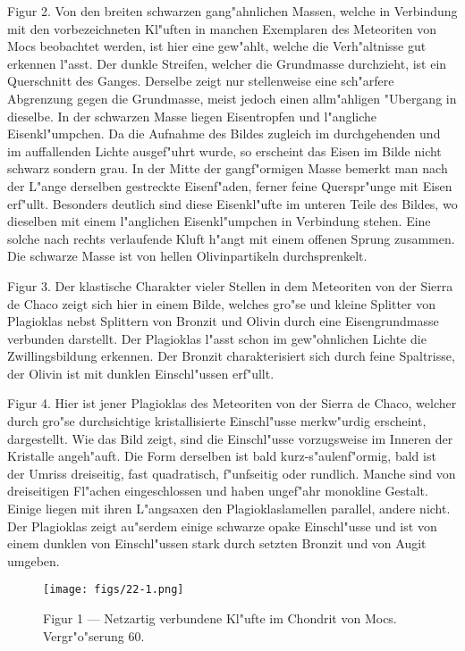 \documentclass[a4paper, 11pt, oneside, polutonikogreek, german]{article}
\begin{document}
Figur 2. Von den breiten schwarzen gang"ahnlichen Massen, welche in Verbindung mit den vorbezeichneten Kl"uften in manchen Exemplaren des Meteoriten von Mocs beobachtet werden, ist hier eine gew"ahlt, welche die Verh"altnisse gut erkennen l"asst. Der dunkle Streifen, welcher die Grundmasse durchzieht, ist ein Querschnitt des Ganges. Derselbe zeigt nur stellenweise eine sch"arfere Abgrenzung gegen die Grundmasse, meist jedoch einen allm"ahligen "Ubergang in dieselbe. In der schwarzen Masse liegen Eisentropfen und l"angliche Eisenkl"umpchen. Da die Aufnahme des Bildes zugleich im durchgehenden und im auffallenden Lichte ausgef"uhrt wurde, so erscheint das Eisen im Bilde nicht schwarz sondern grau. In der Mitte der gangf"ormigen Masse bemerkt man nach der L"ange derselben gestreckte Eisenf"aden, ferner feine Querspr"unge mit Eisen erf"ullt. Besonders deutlich sind diese Eisenkl"ufte im unteren Teile des Bildes, wo dieselben mit einem l"anglichen Eisenkl"umpchen in Verbindung stehen. Eine solche nach rechts verlaufende Kluft h"angt mit einem offenen Sprung zusammen. Die schwarze Masse ist von hellen Olivinpartikeln durchsprenkelt.

Figur 3. Der klastische Charakter vieler Stellen in dem Meteoriten von der Sierra de Chaco zeigt sich hier in einem Bilde, welches gro"se und kleine Splitter von Plagioklas nebst Splittern von Bronzit und Olivin durch eine Eisengrundmasse verbunden darstellt. Der Plagioklas l"asst schon im gew"ohnlichen Lichte die Zwillingsbildung erkennen. Der Bronzit charakterisiert sich durch feine Spaltrisse, der Olivin ist mit dunklen Einschl"ussen erf"ullt.

Figur 4. Hier ist jener Plagioklas des Meteoriten von der Sierra de Chaco, welcher durch gro"se durchsichtige kristallisierte Einschl"usse merkw"urdig erscheint, dargestellt. Wie das Bild zeigt, sind die Einschl"usse vorzugsweise im Inneren der Kristalle angeh"auft. Die Form derselben ist bald kurz-s"aulenf"ormig, bald ist der Umriss dreiseitig, fast quadratisch, f"unfseitig oder rundlich. Manche sind von dreiseitigen Fl"achen eingeschlossen und haben ungef"ahr monokline Gestalt. Einige liegen mit ihren L"angsaxen den Plagioklaslamellen parallel, andere nicht. Der Plagioklas zeigt au"serdem einige schwarze opake Einschl"usse und ist von einem dunklen von Einschl"ussen stark durch setzten Bronzit und von Augit umgeben.
\clearpage

\vspace*{\fill}
\begin{figure}[H]
\centering
\texttt{[image: figs/22-1.png]}
\caption{\small Figur 1 --- Netzartig verbundene Kl"ufte im Chondrit von Mocs. Vergr"o"serung 60.}
\end{figure}
\vspace*{\fill}
\clearpage
\end{document}
